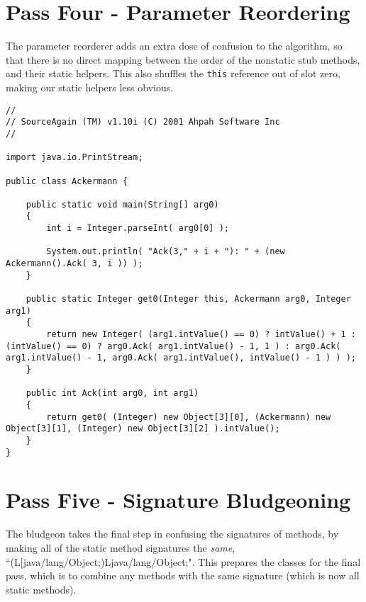 \section{Pass Four - Parameter Reordering}
The parameter reorderer adds an extra dose of confusion to the algorithm, so that there is no direct mapping 
between the order of the nonstatic stub methods, and their static helpers.  This also shuffles the \verb/this/
reference out of slot zero, making our static helpers less obvious.

\begin{verbatim}
// 
// SourceAgain (TM) v1.10i (C) 2001 Ahpah Software Inc
// 

import java.io.PrintStream;

public class Ackermann {

    public static void main(String[] arg0)
    {
        int i = Integer.parseInt( arg0[0] );

        System.out.println( "Ack(3," + i + "): " + (new Ackermann().Ack( 3, i )) );
    }

    public static Integer get0(Integer this, Ackermann arg0, Integer arg1)
    {
        return new Integer( (arg1.intValue() == 0) ? intValue() + 1 : (intValue() == 0) ? arg0.Ack( arg1.intValue() - 1, 1 ) : arg0.Ack( arg1.intValue() - 1, arg0.Ack( arg1.intValue(), intValue() - 1 ) ) );
    }

    public int Ack(int arg0, int arg1)
    {
        return get0( (Integer) new Object[3][0], (Ackermann) new Object[3][1], (Integer) new Object[3][2] ).intValue();
    }
}
\end{verbatim}

\section{Pass Five - Signature Bludgeoning}
The bludgeon takes the final step in confusing the signatures of methods, by making all of the static
method signatures the \emph{same}, ``(L[java/lang/Object;)Ljava/lang/Object;".  This prepares the classes
for the final pass, which is to combine any methods with the same signature (which is now all static methods).


